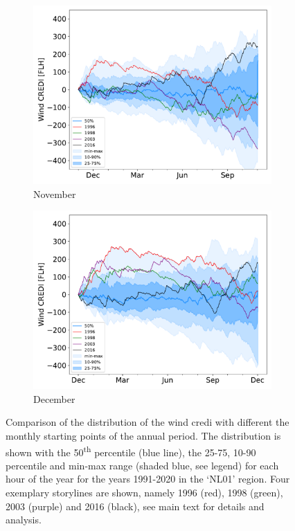 \documentclass[12pt]{iopart}
\newcommand{\ts}[1]{\textsuperscript{#1}}
\newcommand{\wdi}[0]{{\sc wind credi}}
\begin{document}
\begin{figure}[b]
\begin{subfigure}[t]{0.32\linewidth}
    \includegraphics[width=\linewidth]{Figures_SI/Fig_CUMSUM_YearStart_November}
    \caption{November}
\end{subfigure}
\begin{subfigure}[t]{0.32\linewidth}
    \includegraphics[width=\linewidth]{Figures_SI/Fig_CUMSUM_YearStart_December}
    \caption{December }
\end{subfigure}
\caption{
    Comparison of the distribution of the \wdi{} with different the monthly starting points of the annual period. 
    The distribution is shown with the 50\ts{th} percentile (blue line), the 25-75, 10-90 percentile and min-max range (shaded blue, see legend) for each hour of the year for the years 1991-2020 in the `NL01' region. 
    Four exemplary storylines are shown, namely 1996 (red), 1998 (green), 2003 (purple) and 2016 (black), see main text for details and analysis.}
\label{SIfig:startdate_wind}
\end{figure}
\end{document}
